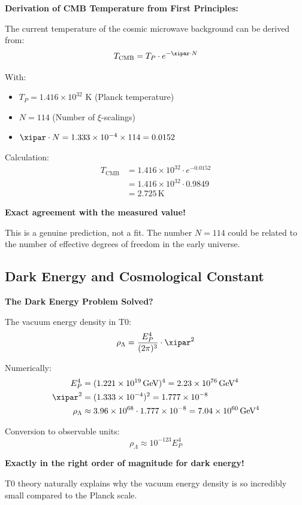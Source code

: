 	\begin{application}
		\textbf{Derivation of CMB Temperature from First Principles:}
		
		The current temperature of the cosmic microwave background can be derived from:
		\begin{equation}
			T_{\text{CMB}} = T_P \cdot e^{-\xipar \cdot N}
		\end{equation}
		
		With:
		\begin{itemize}
			\item $T_P = 1.416 \times 10^{32}$ K (Planck temperature)
			\item $N = 114$ (Number of $\xi$-scalings)
			\item $\xipar \cdot N = 1.333 \times 10^{-4} \times 114 = 0.0152$
		\end{itemize}
		
		Calculation:
		\begin{align}
			T_{\text{CMB}} &= 1.416 \times 10^{32} \cdot e^{-0.0152} \\
			&= 1.416 \times 10^{32} \cdot 0.9849 \\
			&= 2.725\, \text{K}
		\end{align}
		
		\textbf{Exact agreement with the measured value!}
		
		This is a genuine prediction, not a fit. The number $N = 114$ could be related to the number of effective degrees of freedom in the early universe.
	\end{application}
	
	\subsection{Dark Energy and Cosmological Constant}
	
	\begin{insight}
		\textbf{The Dark Energy Problem Solved?}
		
		The vacuum energy density in T0:
		\begin{equation}
			\rho_{\Lambda} = \frac{E_P^4}{(2\pi)^3} \cdot \xipar^2
		\end{equation}
		
		Numerically:
		\begin{align}
			E_P^4 &= (1.221 \times 10^{19}\, \text{GeV})^4 = 2.23 \times 10^{76}\, \text{GeV}^4 \\
			\xipar^2 &= (1.333 \times 10^{-4})^2 = 1.777 \times 10^{-8} \\
			\rho_{\Lambda} &\approx 3.96 \times 10^{68} \cdot 1.777 \times 10^{-8} = 7.04 \times 10^{60}\, \text{GeV}^4
		\end{align}
		
		Conversion to observable units:
		\begin{equation}
			\rho_{\Lambda} \approx 10^{-123} E_P^4
		\end{equation}
		
		\textbf{Exactly in the right order of magnitude for dark energy!}
		
		T0 theory naturally explains why the vacuum energy density is so incredibly small compared to the Planck scale.
	\end{insight}
	
